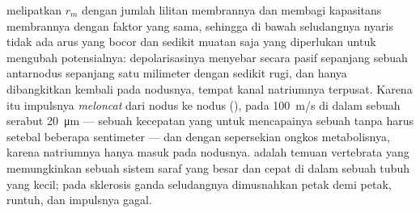 \begin{proposition}\label{prop:b2:neurons-synapses:myelin}
 melipatkan $r_m$ dengan jumlah lilitan membrannya dan membagi
kapasitans membrannya dengan faktor yang sama, sehingga di bawah
seludangnya nyaris tidak ada arus yang bocor dan sedikit muatan saja
yang diperlukan untuk mengubah potensialnya: depolarisasinya menyebar
secara pasif sepanjang sebuah antarnodus sepanjang satu milimeter
dengan sedikit rugi, dan  hanya dibangkitkan kembali
pada nodusnya, tempat kanal natriumnya terpusat. Karena itu impulsnya
\emph{meloncat} dari nodus ke nodus (\emph{}),
pada \qty{100}{m/s} di dalam sebuah serabut \qty{20}{\micro m} ---
sebuah kecepatan yang untuk mencapainya sebuah  tanpa  harus
setebal beberapa sentimeter --- dan dengan sepersekian ongkos
metabolisnya, karena natriumnya hanya masuk pada nodusnya. 
adalah temuan vertebrata yang memungkinkan sebuah sistem saraf yang
besar dan cepat di dalam sebuah tubuh yang kecil; pada sklerosis
ganda seludangnya dimusnahkan petak demi petak, 
runtuh, dan impulsnya gagal.
\end{proposition}


